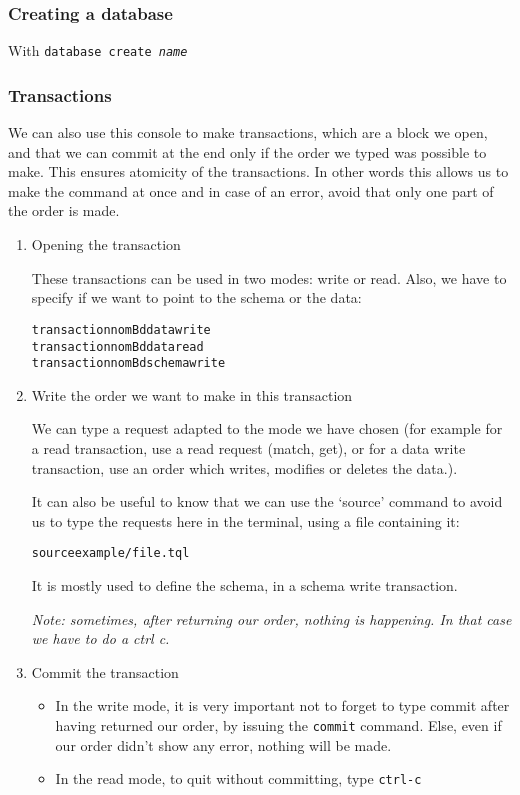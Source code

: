 \documentclass{article}
\begin{document}
\subsubsection{Creating a database}

With \texttt{database create \emph{name}}


  \subsubsection{Transactions}
We can also use this console to make transactions, which are a block we open, and that we can commit at the end only if the order we typed was possible to make. This ensures atomicity of the transactions. In other words this allows us to make the command at once and in case of an error, avoid that only one part of the order is made.

\begin{enumerate}
\item Opening  the transaction

These transactions can be used in two modes: write or read. Also, we have to specify if we want to point to the schema or the data:

\begin{alltt}
transaction nomBd data write
transaction nomBd data read
transaction nomBd schema write
\end{alltt}       

\item Write the order we want to make in this transaction

We can type a request adapted to the mode we have chosen (for example for a read transaction, use a read request (match, get), or for a data write transaction, use an order which writes, modifies or deletes the data.).

It can also be useful to know that we can use the ‘source’ command to avoid us to type the requests here in the terminal, using a file containing it: 
\begin{alltt}source example/file.tql \end{alltt}
It is mostly used to define the schema, in a schema write transaction.

\emph{Note: sometimes, after returning our order, nothing is happening. In that case we have to do a ctrl c.}

\item Commit the transaction
\begin{itemize}
\item In the write mode, it is very important not to forget to type commit
  after having returned our order, by issuing the \texttt{commit}
  command. Else, even if our order didn’t show any error, nothing will be
  made.
\item In the read mode, to quit without committing, type \texttt{ctrl-c}
\end{itemize}

\end{enumerate}
\end{document}
